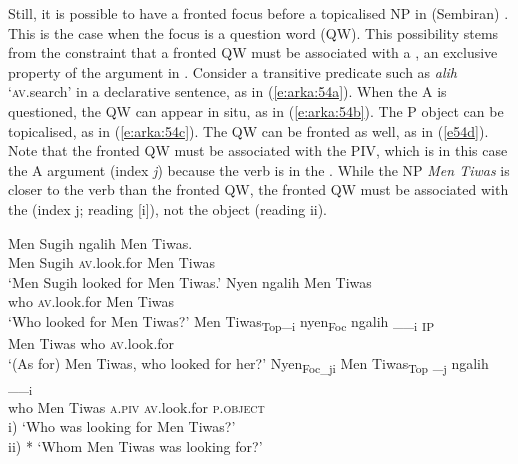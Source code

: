 \documentclass[output=paper
,modfonts
,nonflat]{langsci/langscibook}
\begin{document}
Still, it is possible to have a fronted focus before a topicalised NP in (Sembiran) . This is the case when the focus is a question word (QW).  This possibility stems from the constraint that a fronted QW must be associated with a , an exclusive property of the  argument in  \citep{Arka2003}. Consider a transitive predicate such as \textit{alih} ‘\textsc{av}.search’ in a declarative sentence, as in (\ref{e:arka:54a}). When the A  is questioned, the QW can appear in situ, as in (\ref{e:arka:54b}). The P object can be topicalised, as in (\ref{e:arka:54c}). The QW can be fronted as well, as in (\ref{e54d}). Note that the fronted QW must be associated with the PIV, which is in this case the A argument (index \textit{j}) because the verb is in the . While the NP \textit{Men Tiwas} is closer to the verb than the fronted QW, the fronted QW must be associated with the  (index j; reading [i]), not the object (reading ii).

\largerpage	
\begin{exe}
	\ex\label{e:arka:54}
	\begin{xlist}
		\ex\label{e:arka:54a}
		\gll Men Sugih   ngalih   Men Tiwas.\\
		Men Sugih   \textsc{av}.look.for  Men Tiwas\\
		\glt ‘Men Sugih looked for Men Tiwas.’
		\ex\label{e:arka:54b}
		\gll Nyen   ngalih   Men Tiwas{\USQMark}\\
		who  \textsc{av}.look.for  Men Tiwas\\
		\glt ‘Who looked for Men Tiwas?’
		\ex\label{e:arka:54c}
		\gll {\ob}Men Tiwas{\cb}\textsubscript{Top}\_\textsubscript{i}   {\ob}{\ob}nyen{\cb}\textsubscript{Foc}    {\ob}ngalih   \_\_\textsubscript{i} {\cb}{\cb}\textsubscript{IP}{\USQMark}\\
		\phantom{[}Men Tiwas  \phantom{[[}who  \phantom{[}\textsc{av}.look.for   \\
		\glt ‘(As for) Men Tiwas, who looked for her?’
		\ex\label{e54d}
		\gll {\ob}Nyen{\cb}\textsubscript{Foc\_j{\USSlash}{\USStar}i}  {\ob}Men Tiwas{\cb}\textsubscript{Top}  {\ob}\_\textsubscript{j}  ngalih    \_\_\textsubscript{i}{\cb}{\USQMark}\\
		\phantom{[}who  \phantom{[}Men Tiwas  \phantom{[}\textsc{a}.\textsc{piv}  \textsc{av}.look.for  \textsc{p}.\textsc{object}\\
		\glt
		i)  ‘Who was looking for Men Tiwas?’\\
		ii)  * ‘Whom Men Tiwas was looking for?’
	\end{xlist}
\end{exe}
\end{document}
